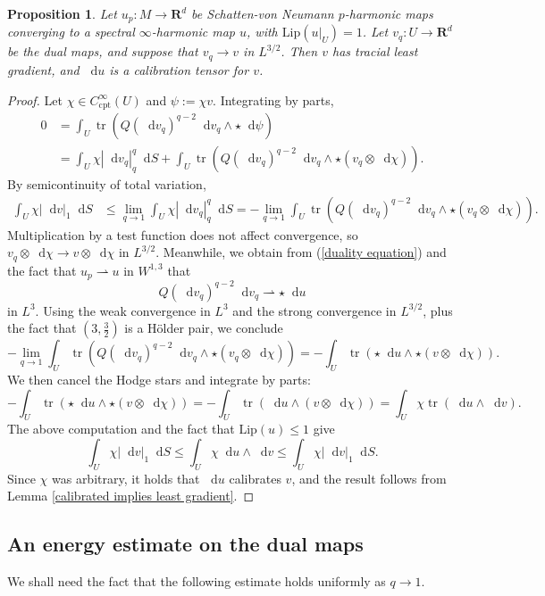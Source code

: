 \documentclass[reqno,11pt]{amsart}
\newcommand{\RR}{\mathbf{R}}
\newcommand*\dif{\mathop{}\!\mathrm{d}}
\DeclareMathOperator{\tr}{tr}
\newcommand{\Lip}{\mathrm{Lip}}
\newcommand{\cpt}{\mathrm{cpt}}
\newtheorem{proposition}[theorem]{Proposition}
\newcommand{\weakto}{\rightharpoonup}
\theoremstyle{definition}
\numberwithin{equation}{section}
\begin{document}
\begin{proposition}\label{constructing the dual map}
Let $u_p: M \to \RR^d$ be Schatten-von Neumann $p$-harmonic maps converging to a spectral $\infty$-harmonic map $u$, with $\Lip(u|_U) = 1$.
Let $v_q: U \to \RR^d$ be the dual maps, and suppose that $v_q \to v$ in $L^{3/2}$.
Then $v$ has tracial least gradient, and $\dif u$ is a calibration tensor for $v$.
\end{proposition}
\begin{proof}
Let $\chi \in C^\infty_\cpt(U)$ and $\psi := \chi v$.
Integrating by parts,
\begin{align*}
0 &= \int_U \tr(Q(\dif v_q)^{q - 2} \dif v_q \wedge \star \dif \psi) \\
&= \int_U \chi|\dif v_q|_{q}^q \dif S + \int_U \tr(Q(\dif v_q)^{q - 2} \dif v_q \wedge \star (v_q \otimes \dif \chi)).
\end{align*}
By semicontinuity of total variation,
\begin{align*}
\int_U \chi|\dif v|_{1} \dif S
&\leq \lim_{q \to 1} \int_U \chi|\dif v_q|_{q}^q  \dif S
= -\lim_{q \to 1} \int_U \tr(Q(\dif v_q)^{q - 2} \dif v_q \wedge \star (v_q \otimes \dif \chi)).
\end{align*}
Multiplication by a test function does not affect convergence, so $v_q \otimes \dif \chi \to v \otimes \dif \chi$ in $L^{3/2}$.
Meanwhile, we obtain from (\ref{duality equation}) and the fact that $u_p \weakto u$ in $W^{1, 3}$ that
$$Q(\dif v_q)^{q - 2} \dif v_q \weakto \star \dif u$$
in $L^3$.
Using the weak convergence in $L^3$ and the strong convergence in $L^{3/2}$, plus the fact that $(3, \frac{3}{2})$ is a H\"older pair, we conclude
$$-\lim_{q \to 1} \int_U \tr(Q(\dif v_q)^{q - 2} \dif v_q \wedge \star (v_q \otimes \dif \chi)) = -\int_U \tr(\star \dif u \wedge \star (v \otimes \dif \chi)).$$
We then cancel the Hodge stars and integrate by parts:
$$-\int_U \tr(\star \dif u \wedge \star (v \otimes \dif \chi)) = -\int_U \tr(\dif u \wedge (v \otimes \dif \chi)) = \int_U \chi \tr(\dif u \wedge \dif v).$$
The above computation and the fact that $\Lip(u) \leq 1$ give
$$\int_U \chi|\dif v|_{1} \dif S \leq \int_U \chi\dif u \wedge \dif v \leq \int_U \chi|\dif v|_{1} \dif S.$$
Since $\chi$ was arbitrary, it holds that $\dif u$ calibrates $v$, and the result follows from Lemma \ref{calibrated implies least gradient}.
\end{proof}


\subsection{An energy estimate on the dual maps}
We shall need the fact that the following estimate holds uniformly as $q \to 1$.
\end{document}
